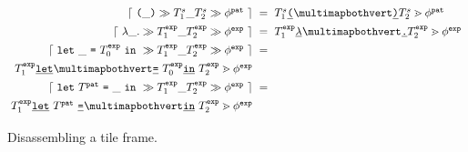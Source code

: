 \begin{figure}
  \vspace{-3px}
  \[
  \setlength{\fboxsep}{1pt}
  \arraycolsep=3pt\def\arraystretch{1.4}\begin{array}{rcl}
      \disassembleTileFrame{
        \tframelit{
          \sparen{\_}
        }{
          \tframelit{\tiles^s_1\_\tiles^s_2}{\tfrelem^{\pat}}
        }
      } & = &
        \zipper{
          \pointing{\tiles^s_1\tokenLit{\texttt{(}}~}{~\tokenLit{\texttt{)}}\tiles^s_2}
        }{
          \tfrelem^{\pat}
        } \\

      \disassembleTileFrame{
        \tframelit{
          \slam{\_}{}
        }{
          \tframelit{\tiles^{\expr}_1\_\tiles^{\expr}_2}{\tfrelem^{\expr}}
        }
      } & = &
        \zipper{
          \pointing{\tiles^{\expr}_1\tokenLit{\lambda}~}{~\tokenLit{\texttt{.}}\tiles^{\expr}_2}
        }{
          \tfrelem^{\expr}
        } \\

      \disassembleTileFrame{
        \tframelit{
          \slet{\_}{\tiles^{\expr}_0}{}
        }{
          \tframelit{\tiles^{\expr}_1\_\tiles^{\expr}_2}{\tfrelem^{\expr}}
        }
      } & = & \\
        \zipper{
          \pointing{
            \tiles^{\expr}_1\tokenLit{\texttt{let}}~
          }{
            ~\tokenLit{\texttt{=}}~\tiles^{\expr}_0\tokenLit{\texttt{in}}~\tiles^{\expr}_2
          }
        }{
          \tfrelem^{\expr}
        } \\

      \disassembleTileFrame{
        \tframelit{
          \slet{\tiles^{\pat}}{\_}{}
        }{
          \tframelit{\tiles^{\expr}_1\_\tiles^{\expr}_2}{\tfrelem^{\expr}}
        }
      } & = & \\
        \zipper{
          \pointing{
            \tiles^{\expr}_1\tokenLit{\texttt{let}}~\tiles^{\pat}~\tokenLit{\texttt{=}}~
          }{
            ~\tokenLit{\texttt{in}}~\tiles^{\expr}_2
          }
        }{
          \tfrelem^{\expr}
        }
  \end{array}\]
  \caption{
    Disassembling a tile frame.
  }
  \label{fig:disassemble-tile}
\end{figure}